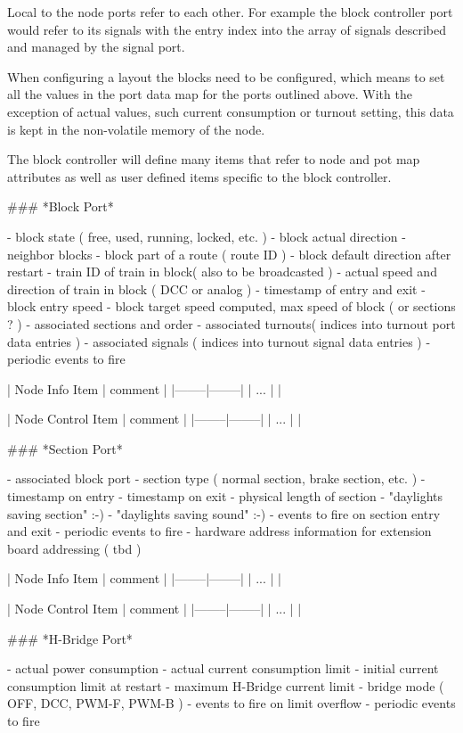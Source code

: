 Local to the node ports refer to each other. For example the block controller port would refer to its signals with the entry index into the array of signals described and managed by the signal port.

When configuring a layout the blocks need to be configured, which means to set all the values in the port data map for the ports outlined above. With the exception of actual values, such current consumption or turnout setting, this data is kept in the non-volatile memory of the node.

The block controller will define many items that refer to node and pot map attributes as well as user defined items specific to the block controller.

### *Block Port*

- block state ( free, used, running, locked, etc. )
- block actual direction
- neighbor blocks
- block part of a route ( route ID )
- block default direction after restart
- train ID of train in block( also to be broadcasted )
- actual speed and direction of train in block ( DCC or analog )
- timestamp of entry and exit
- block entry speed
- block target speed computed, max speed of block ( or sections ? )
- associated sections and order
- associated turnouts( indices into turnout port data entries )
- associated signals ( indices into turnout signal data entries )
- periodic events to fire

| Node Info Item | comment |
|--------|--------|
| ... | |

| Node Control Item | comment |
|--------|--------|
| ... | |

### *Section Port*

- associated block port
- section type ( normal section, brake section, etc. )
- timestamp on entry
- timestamp on exit
- physical length of section
- "daylights saving section" :-)
- "daylights saving sound" :-)
- events to fire on section entry and exit
- periodic events to fire
- hardware address information for extension board addressing ( tbd )

| Node Info Item | comment |
|--------|--------|
| ... | |

| Node Control Item | comment |
|--------|--------|
| ... | |

### *H-Bridge Port*

- actual power consumption
- actual current consumption limit
- initial current consumption limit at restart
- maximum H-Bridge current limit
- bridge mode ( OFF, DCC, PWM-F, PWM-B )
- events to fire on limit overflow
- periodic events to fire

